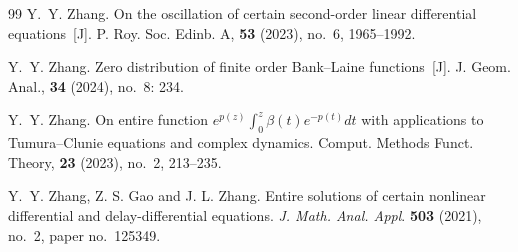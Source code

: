 \documentclass[12pt]{amsart}
\numberwithin{equation}{section}
\begin{document}
\begin{thebibliography}{99}
Y.~Y. Zhang. On the oscillation of certain second-order linear differential equations~[J]. P. Roy. Soc. Edinb. A, {\bf 53} (2023), no.~6, 1965--1992.


Y.~Y. Zhang. Zero distribution of finite order Bank--Laine functions~[J]. J. Geom. Anal., {\bf 34} (2024), no.~8: 234.

Y.~Y. Zhang. {On entire function $e^{p(z)}\int_0^{z}\beta(t)e^{-p(t)}dt$ with applications to Tumura--Clunie equations and complex dynamics.} Comput. Methods Funct. Theory, {\bf 23} (2023), no.~2, 213--235.

Y.~Y. Zhang, Z. S. Gao and J. L. Zhang. Entire solutions of certain nonlinear differential and delay-differential equations. {\it J. Math. Anal. Appl}. {\bf 503} (2021), no.~2, paper no.~125349.

\end{thebibliography}
\end{document}

